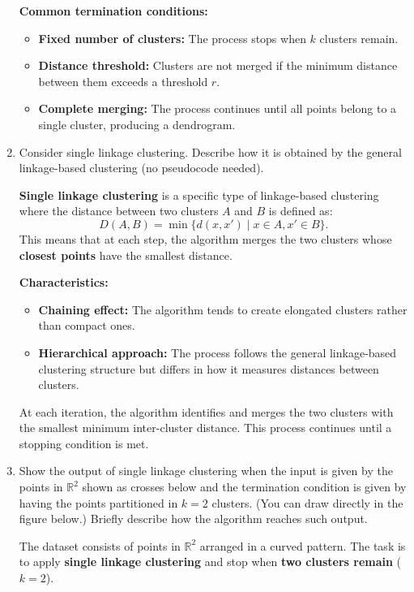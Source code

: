 \documentclass[a4paper,11pt,oneside]{book}
\begin{document}
\begin{enumerate}
\begin{solution}
                \textbf{Common termination conditions:}
                \begin{itemize}
                    \item \textbf{Fixed number of clusters:} The process stops when $k$ clusters remain.
                    \item \textbf{Distance threshold:} Clusters are not merged if the minimum distance between them exceeds a threshold $r$.
                    \item \textbf{Complete merging:} The process continues until all points belong to a single cluster, producing a dendrogram.
                \end{itemize}
            \end{solution}
        \clearpage
        \item Consider single linkage clustering. Describe how it is obtained by the general linkage-based clustering (no pseudocode needed).
            \begin{solution}
                \textbf{Single linkage clustering} is a specific type of linkage-based clustering where the distance between two clusters $A$ and $B$ is defined as:
                \[
                D(A, B) = \min \{ d(x, x') \mid x \in A, x' \in B \}.
                \]
                This means that at each step, the algorithm merges the two clusters whose \textbf{closest points} have the smallest distance.
                
                \textbf{Characteristics:}
                \begin{itemize}
                    \item \textbf{Chaining effect:} The algorithm tends to create elongated clusters rather than compact ones.
                    \item \textbf{Hierarchical approach:} The process follows the general linkage-based clustering structure but differs in how it measures distances between clusters.
                \end{itemize}
                
                At each iteration, the algorithm identifies and merges the two clusters with the smallest minimum inter-cluster distance. This process continues until a stopping condition is met.
            \end{solution}
        
        \clearpage
        \item Show the output of single linkage clustering when the input is given by the points in $\mathbb{R}^2$ shown as crosses below and the termination condition is given by having the points partitioned in $k=2$ clusters. (You can draw directly in the figure below.) Briefly describe how the algorithm reaches such output.
            \begin{solution}
                The dataset consists of points in $\mathbb{R}^2$ arranged in a curved pattern. The task is to apply \textbf{single linkage clustering} and stop when \textbf{two clusters remain} ($k = 2$).
                

\end{solution}
\end{enumerate}
\end{document}
